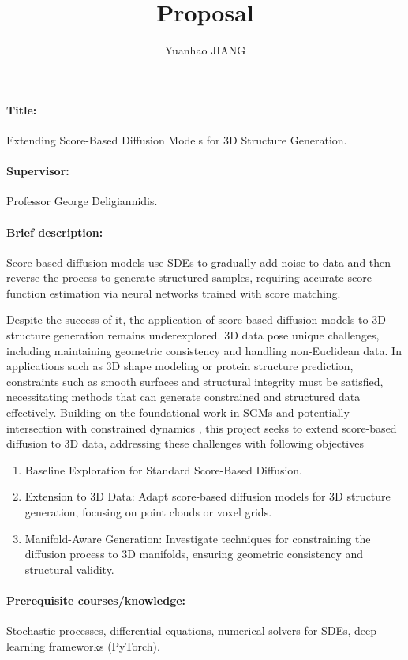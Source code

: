 \documentclass[letterpaper, 12pt]{article}
\title{Proposal}
\author{Yuanhao JIANG}
\date{}
\begin{document}
\maketitle

\paragraph{Title:}
Extending Score-Based Diffusion Models for 3D Structure Generation.
\paragraph{Supervisor:}
Professor George Deligiannidis.
\paragraph{Brief description:}
Score-based diffusion models \cite{song2020score,song2021maximum} use SDEs to gradually add noise to data and then reverse the process to generate structured samples, requiring accurate score function estimation via neural networks trained with score matching.

Despite the success of it, the application of score-based diffusion models to 3D structure generation remains underexplored. 3D data pose unique challenges, including maintaining geometric consistency and handling non-Euclidean data. In applications such as 3D shape modeling or protein structure prediction, constraints such as smooth surfaces and structural integrity must be satisfied, necessitating methods that can generate constrained and structured data effectively. Building on the foundational work in SGMs \cite{song2020score,song2021maximum} and potentially intersection with constrained dynamics \cite{huang2022riemannian,chung2022improving,de2022riemannian}, this project seeks to extend score-based diffusion to 3D data, addressing these challenges with following objectives
\begin{enumerate}
    \item Baseline Exploration for Standard Score-Based Diffusion.
    \item Extension to 3D Data: Adapt score-based diffusion models for 3D structure generation, focusing on point clouds or voxel grids.
    \item Manifold-Aware Generation: Investigate techniques for constraining the diffusion process to 3D manifolds, ensuring geometric consistency and structural validity.
\end{enumerate}
\paragraph{Prerequisite courses/knowledge:}
Stochastic processes, differential equations, numerical solvers for SDEs, deep learning frameworks (PyTorch).
\end{document}

